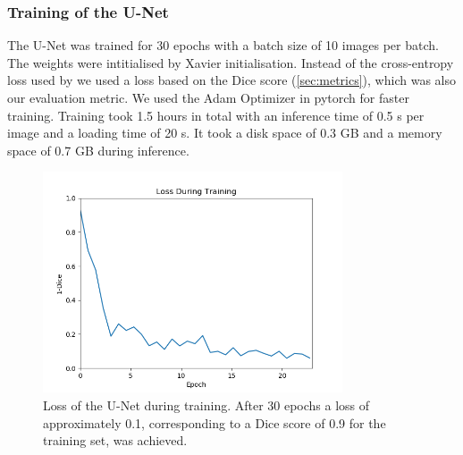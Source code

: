 \documentclass[final]{article}
\begin{document}
\subsubsection{Training of the U-Net}
The U-Net was trained for 30 epochs with a batch size of 10 images per batch. The weights were intitialised by Xavier initialisation. Instead of the cross-entropy loss used by \cite{ronneberger2015u} we used a loss based on the Dice score (\cref{sec:metrics}), which was also our evaluation metric. We used the Adam Optimizer in pytorch for faster training. Training took 1.5 hours in total with an inference time of 0.5 s per image and a loading time of 20 s. It took a disk space of 0.3 GB and a
memory space of 0.7 GB during inference. 
\begin{figure}[h]
\centering
\includegraphics[width=0.79\textwidth]{trainingloss}
\caption{Loss of the U-Net during training. After 30 epochs a loss of approximately 0.1, corresponding to a Dice score of 0.9 for the training set, was achieved.}
\label{fig:rfresults}
\end{figure}
\end{document}

